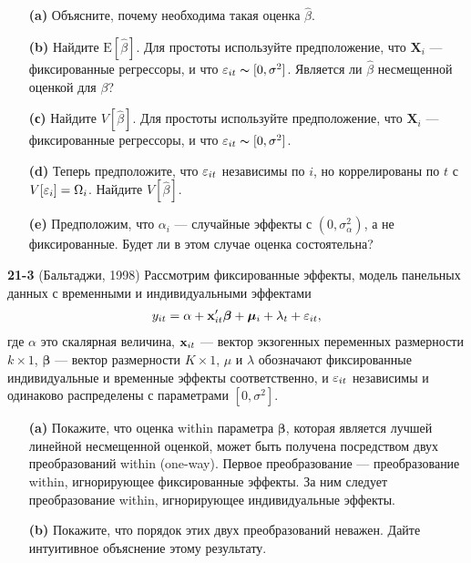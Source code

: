 \begin{itemize}
\item[{\bf (a)}] Объясните, почему необходима такая оценка $\hat{\beta}$.

\item[{\bf (b)}] Найдите $\mathrm E[\hat{\beta}]$. Для простоты используйте предположение, что $\mathbf X_i$ --- фиксированные регрессоры, и что $\varepsilon_{it} \thicksim [0, \sigma^2]$. Является ли $\hat{\beta}$ несмещенной оценкой для $\beta$?

\item[{\bf (с)}] Найдите $V[\hat{\beta}]$. Для простоты используйте предположение, что $\mathbf X_i$ --- фиксированные регрессоры, и что $\varepsilon_{it} \thicksim [0, \sigma^2]$.

\item[{\bf (d)}] Теперь предположите, что $\varepsilon_{it}$ независимы по $i$, но коррелированы по $t$ с $V[\varepsilon_i]=\Omega_i$. Найдите $V[\hat{\beta}]$.

\item[{\bf (e)}] Предположим, что $\alpha_i$ --- случайные эффекты с $(0, \sigma^2_\alpha)$, а не фиксированные. Будет ли в этом случае оценка состоятельна?

\end{itemize}

\textbf{21-3} (Бальтаджи, 1998) Рассмотрим фиксированные эффекты, модель панельных данных с временными и индивидуальными эффектами
 \begin{align}
y_{it}=\alpha + \mathbf{x}'_{it} \bm\beta +\bm\mu_i+\lambda _t+\varepsilon_{it},
\nonumber
\end{align}
где $\alpha$  это скалярная величина, $\mathbf{x}_{it}$ --- вектор экзогенных переменных размерности $k \times 1$, $\bm\beta$ --- вектор размерности $K \times 1$, $\mu$ и $\lambda$ обозначают фиксированные индивидуальные и временные эффекты соответственно, и $\varepsilon_{it}$ независимы и одинаково распределены с параметрами $[0, \sigma^2]$.

\begin{itemize}
\item[{\bf (a)}] Покажите, что оценка within параметра $\bm\beta$, которая является лучшей линейной несмещенной оценкой, может быть получена посредством двух преобразований within (one-way). Первое преобразование --- преобразование within, игнорирующее фиксированные эффекты. За ним следует преобразование within, игнорирующее индивидуальные эффекты.

\item[{\bf (b)}]  Покажите, что порядок этих двух преобразований неважен. Дайте интуитивное объяснение этому результату.

\end{itemize}

